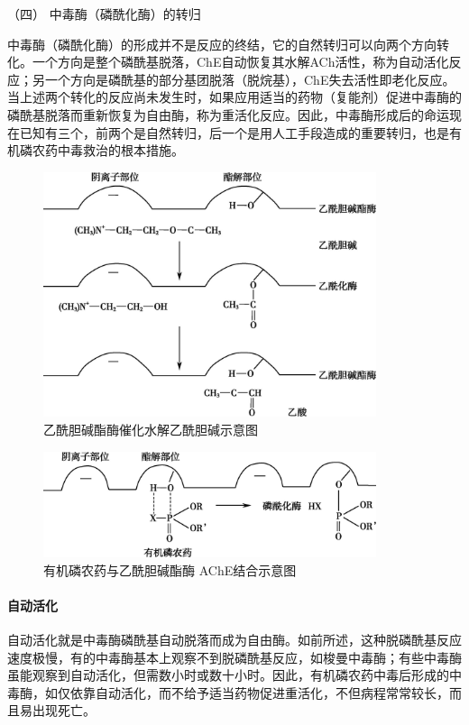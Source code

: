 \hypertarget{text00139.htmlux5cux23CHP5-3-1-1-4}{}
（四） 中毒酶（磷酰化酶）的转归

中毒酶（磷酰化酶）的形成并不是反应的终结，它的自然转归可以向两个方向转化。一个方向是整个磷酰基脱落，ChE自动恢复其水解ACh活性，称为自动活化反应；另一个方向是磷酰基的部分基团脱落（脱烷基），ChE失去活性即老化反应。当上述两个转化的反应尚未发生时，如果应用适当的药物（复能剂）促进中毒酶的磷酰基脱落而重新恢复为自由酶，称为重活化反应。因此，中毒酶形成后的命运现在已知有三个，前两个是自然转归，后一个是用人工手段造成的重要转归，也是有机磷农药中毒救治的根本措施。

\begin{figure}[!htbp]
 \centering
 \includegraphics[width=3.84375in,height=2.83333in]{./images/Image00201.jpg}
 \captionsetup{justification=centering}
 \caption{乙酰胆碱酯酶催化水解乙酰胆碱示意图}
 \label{fig55-3}
  \end{figure} 

\begin{figure}[!htbp]
 \centering
 \includegraphics[width=3.84375in,height=1.21875in]{./images/Image00202.jpg}
 \captionsetup{justification=centering}
 \caption{有机磷农药与乙酰胆碱酯酶 AChE结合示意图}
 \label{fig55-4}
  \end{figure} 

\paragraph{自动活化}

自动活化就是中毒酶磷酰基自动脱落而成为自由酶。如前所述，这种脱磷酰基反应速度极慢，有的中毒酶基本上观察不到脱磷酰基反应，如梭曼中毒酶；有些中毒酶虽能观察到自动活化，但需数小时或数十小时。因此，有机磷农药中毒后形成的中毒酶，如仅依靠自动活化，而不给予适当药物促进重活化，不但病程常常较长，而且易出现死亡。

